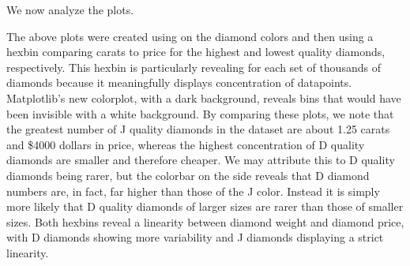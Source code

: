 We now analyze the plots.

The above plots were created using  on the diamond colors and then using a hexbin comparing carats to price for the highest and lowest quality diamonds, respectively. 
This hexbin is particularly revealing for each set of thousands of diamonds because it meaningfully displays concentration of datapoints. 
Matplotlib's new  colorplot, with a dark background, reveals bins that would have been invisible with a white background.
By comparing these plots, we note that the greatest number of J quality diamonds in the dataset are about 1.25 carats and \$4000 dollars in price, whereas the highest concentration of D quality diamonds are smaller and therefore cheaper. 
We may attribute this to D quality diamonds being rarer, but the colorbar on the side reveals that D diamond numbers are, in fact, far higher than those of the J color. 
Instead it is simply more likely that D quality diamonds of larger sizes are rarer than those of smaller sizes. 
Both hexbins reveal a linearity between diamond weight and diamond price, with D diamonds showing more variability and J diamonds displaying a strict linearity.